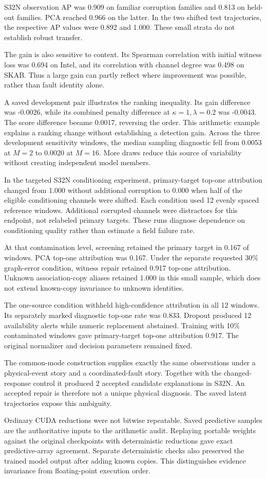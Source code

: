 S32N observation AP was 0.909 on familiar corruption families and 0.813 on held-out families. PCA reached 0.966 on the latter. In the two shifted test trajectories, the respective AP values were 0.892 and 1.000. These small strata do not establish robust transfer.

The gain is also sensitive to context. Its Spearman correlation with initial witness loss was 0.694 on Intel, and its correlation with channel degree was 0.498 on SKAB. Thus a large gain can partly reflect where improvement was possible, rather than fault identity alone.

A saved development pair illustrates the ranking inequality. Its gain difference was -0.0026, while its combined penalty difference at $\kappa=1,\lambda=0.2$ was -0.0043. The score difference became 0.0017, reversing the order. This arithmetic example explains a ranking change without establishing a detection gain. Across the three development sensitivity windows, the median sampling diagnostic fell from 0.0053 at $M=2$ to 0.0020 at $M=16$. More draws reduce this source of variability without creating independent model members.

In the targeted S32N conditioning experiment, primary-target top-one attribution changed from 1.000 without additional corruption to 0.000 when half of the eligible conditioning channels were shifted. Each condition used 12 evenly spaced reference windows. Additional corrupted channels were distractors for this endpoint, not relabeled primary targets. These runs diagnose dependence on conditioning quality rather than estimate a field failure rate.

At that contamination level, screening retained the primary target in 0.167 of windows. PCA top-one attribution was 0.167. Under the separate requested 30\% graph-error condition, witness repair retained 0.917 top-one attribution. Unknown association-copy aliases retained 1.000 in this small sample, which does not extend known-copy invariance to unknown identities.

The one-source condition withheld high-confidence attribution in all 12 windows. Its separately marked diagnostic top-one rate was 0.833. Dropout produced 12 availability alerts while numeric replacement abstained. Training with 10\% contaminated windows gave primary-target top-one attribution 0.917. The original normalizer and decision parameters remained fixed.

The common-mode construction supplies exactly the same observations under a physical-event story and a coordinated-fault story. Together with the changed-response control it produced 2 accepted candidate explanations in S32N. An accepted repair is therefore not a unique physical diagnosis. The saved latent trajectories expose this ambiguity.

Ordinary CUDA reductions were not bitwise repeatable. Saved predictive samples are the authoritative inputs to the arithmetic audit. Replaying portable weights against the original checkpoints with deterministic reductions gave exact predictive-array agreement. Separate deterministic checks also preserved the trained model output after adding known copies. This distinguishes evidence invariance from floating-point execution order.
